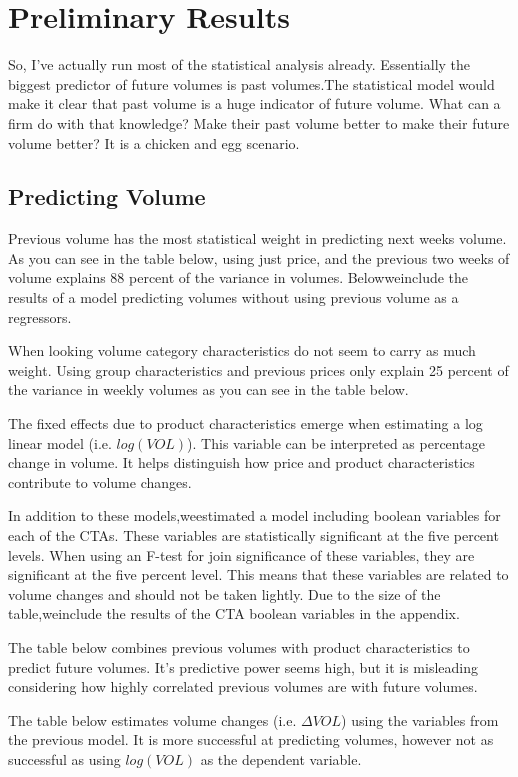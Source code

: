 \documentclass{article}
\begin{document}
\section{Preliminary Results}

So, I've actually run most of the statistical analysis already. Essentially the biggest predictor of future volumes is past volumes.The statistical model would make it clear that past volume is a huge indicator of future volume. What can a firm do with that knowledge? Make their past volume better to make their future volume better? It is a chicken and egg scenario.

\subsection{Predicting Volume}

Previous volume has the most statistical weight in predicting next weeks volume. As you can see in the table below, using just price, and the previous two weeks of volume explains 88 percent of the variance in volumes. Belowweinclude the results of a model predicting volumes without using previous volume as a regressors.


When looking volume category characteristics do not seem to carry as much weight. Using group characteristics and previous prices only explain 25 percent of the variance in weekly volumes as you can see in the table below.

The fixed effects due to product characteristics emerge when estimating a log linear model (i.e. $log(VOL)$).  This variable can be interpreted as percentage change in volume. It helps distinguish how price and product characteristics contribute to volume changes. 


In addition to these models,weestimated a model including boolean variables for each of the CTAs. These variables are statistically significant at the five percent levels. When using an F-test for join significance of these variables, they are significant at the five percent level. This means that these variables are related to volume changes and should not be taken lightly. Due to the size of the table,weinclude the results of the CTA boolean variables in the appendix.

The table below combines previous volumes with product characteristics to predict future volumes. It's predictive power seems high, but it is misleading considering how highly correlated previous volumes are with future volumes.

The table below estimates volume changes (i.e. $\Delta VOL$) using the variables from the previous model. It is more successful at predicting volumes, however not as successful as using $log(VOL)$ as the dependent variable.
\end{document}
